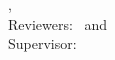 \hfill
\vfill
{
	\small
	\textbf{\thesisName} \\
	\textit{\thesisTitle} \\
	\thesisUniversity, \thesisDate \\
	Reviewers: \thesisFirstReviewer\ and \thesisSecondReviewer \\
	Supervisor: \thesisFirstSupervisor\\[1.5em]
	\textbf{\thesisUniversity} \\
	\textit{\thesisUniversityGroup} \\
	\thesisUniversityInstitute \\
	\thesisUniversityDepartment \\
	\thesisUniversityStreetAddress \\
	\thesisUniversityPostalCode
}
